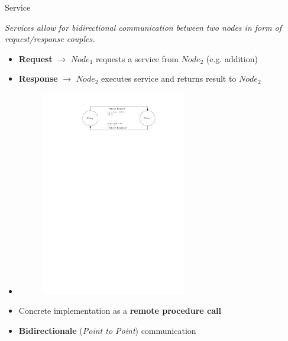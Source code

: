 \documentclass{beamer}
\begin{document}
\begin{frame}{Service}
	\begin{definition}[Service]
		\textit{Services allow for bidirectional communication between two nodes in form of request/response couples.}
	\end{definition}
	\begin{itemize}
		\item \textbf{Request} $\rightarrow$ $Node_1$ requests a service from $Node_2$ (e.g. addition)
		\item \textbf{Response} $\rightarrow$ $Node_2$ executes service and returns result to $Node_2$
		\item 
		\begin{figure}[H]
			\centering
			\includegraphics[width=0.6\textwidth]{./images/ros-service.pdf}
			\label{fig:ros_service}
		\end{figure}
		\item Concrete implementation as a \textbf{remote procedure call}
		\item \textbf{Bidirectionale} (\textit{Point to Point}) communication
	\end{itemize}
\end{frame}
\end{document}
